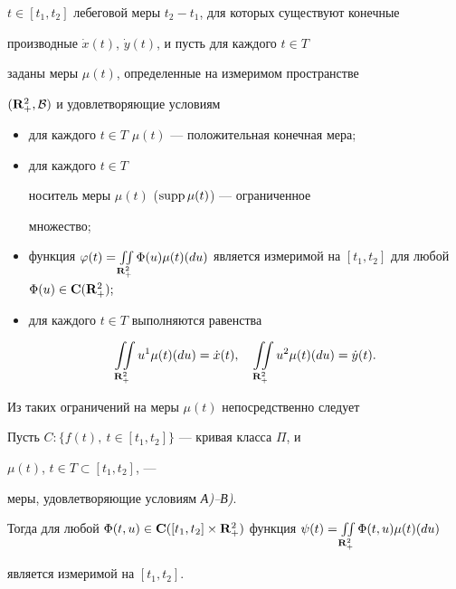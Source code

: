$t\in[t_1,t_2]$ лебеговой меры $t_2-t_1$, для которых существуют конечные


производные $\Dot{x}(t)$, $\Dot{y}(t)$, и пусть для каждого $t\in T$


заданы меры $\mu(t)$, определенные на измеримом пространстве


$({\bold R}^2_+, {\cal B})$ и удовлетворяющие условиям


\begin{itemize}


\item[А)] для каждого $t\in T$\; $\mu(t)$ --- положительная конечная мера;


\item[Б)] для каждого $t\in T$


носитель меры $\mu(t)$ ($\operatorname{supp} \mu(t)$) --- ограниченное


множество;


\item[В)] функция $\varphi (t)=\iint\limits_{ {\bold R}^2_+} \Phi


(u)\mu(t)(du)$ является измеримой на $[t_1,t_2]$ для любой $ \Phi (u)\in


{\bold{C}}({\bold R}^2_+);$


\item[Г)] для каждого $t\in T$ выполняются равенства


$$


\iint\limits_{ {\bold R}^2_+}u^1\mu(t)(du)=\Dot{x}(t),\quad


\iint\limits_{{\bold R}^2_+}u^2\mu(t)(du)=\Dot{y}(t).


$$


\end{itemize}





Из таких ограничений на меры $\mu(t)$ непосредственно следует





\begin{lem}


Пусть $C:\{f(t),\ t\in[t_1,t_2]\}$ --- кривая класса $\Pi$, и


$\mu(t)$, $t\in T \subset [t_1,t_2]$, ---


меры, удовлетворяющие условиям {\em А)--В)}.


Тогда для любой $\Phi(t,u)\in \bold C([t_1,t_2] \times{\bold R}


^2_+)$ функция $\psi(t) =\iint\limits_{ {\bold R}^2_+}\Phi(t,u)\mu(t)(du)$


является измеримой на $[t_1,t_2]$.


\end{lem}





